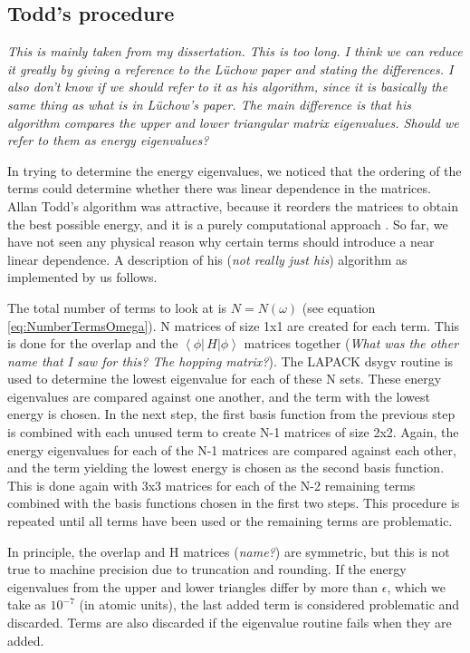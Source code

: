 \documentclass[preprint,showpacs,preprintnumbers,amsmath,amssymb]{revtex4}
\begin{document}
\subsection{Todd's procedure}
\emph{This is mainly taken from my dissertation. This is too long. I think we can reduce it greatly by giving a reference to the L\"uchow paper and stating the differences. I also don't know if we should refer to it as his algorithm, since it is basically the same thing as what is in L\"uchow's paper. The main difference is that his algorithm compares the upper and lower triangular matrix eigenvalues. Should we refer to them as energy eigenvalues?}

In trying to determine the energy eigenvalues, we noticed that the ordering of the terms could determine whether there was linear dependence in the matrices.  Allan Todd's algorithm was attractive, because it reorders the matrices to obtain the best possible energy, and it is a purely computational approach \cite{Todd2007}. So far, we have not seen any physical reason why certain terms should introduce a near linear dependence.  A description of his (\emph{not really just his}) algorithm as implemented by us follows.

The total number of terms to look at is $N = N(\omega)$ (see equation \ref{eq:NumberTermsOmega}).  N matrices of size 1x1 are created for each term.  This is done for the overlap and the $\left\langle \phi \left| \,H \right| \phi \right\rangle$ matrices together (\emph{What was the other name that I saw for this? The hopping matrix?}).  The LAPACK dsygv routine is used to determine the lowest eigenvalue for each of these N sets.  These energy eigenvalues are compared against one another, and the term with the lowest energy is chosen. In the next step, the first basis function from the previous step is combined with each unused term to create N-1 matrices of size 2x2. Again, the energy eigenvalues for each of the N-1 matrices are compared against each other, and the term yielding the lowest energy is chosen as the second basis function. This is done again with 3x3 matrices for each of the N-2 remaining terms combined with the basis functions chosen in the first two steps. This procedure is repeated until all terms have been used or the remaining terms are problematic. 

In principle, the overlap and H matrices (\emph{name?}) are symmetric, but this is not true to machine precision due to truncation and rounding.  If the energy eigenvalues from the upper and lower triangles differ by more than $\epsilon$, which we take as $10^{-7}$ (in atomic units), the last added term is considered problematic and discarded. Terms are also discarded if the eigenvalue routine fails when they are added.
\end{document}
